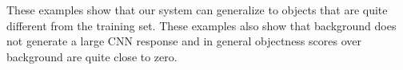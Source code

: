 These examples show that our system can generalize to objects that are quite different from the training set. These examples also show that background does not generate a large CNN response and in general objectness scores over background are quite close to zero.


\begin{figure}[!t]
	\centering	
\end{figure}

